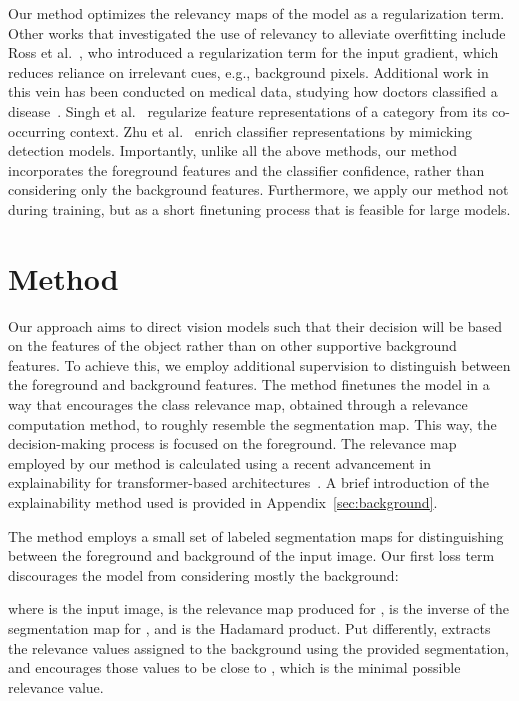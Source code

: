 \documentclass{article}
\begin{document}
Our method optimizes the relevancy maps of the model as a regularization term. Other works that investigated the use of relevancy to alleviate overfitting include Ross et al.~\cite{Ross2017RightFT}, who introduced a regularization term for the input gradient, which reduces reliance on irrelevant cues, e.g., background pixels. Additional work in this vein has been conducted on medical data, studying how doctors classified a disease~\cite{Simpson2019GradMaskRO, viviano2019saliency}. Singh et al.~\cite{singh2020don} regularize feature representations of a category from its co-occurring context. Zhu et al.~\cite{zhu2019deformable} enrich classifier representations by mimicking detection models. Importantly, unlike all the above methods, our method incorporates the foreground features and the classifier confidence, rather than considering only the background features. Furthermore, we apply our method not during training, but as a short finetuning process that is feasible for large models.


\section{Method}
\label{sec:method}


Our approach aims to direct vision models such that their decision will be based on the features of the object rather than on other supportive background features. To achieve this, we employ additional supervision to distinguish between the foreground and background features. The method finetunes the model in a way that encourages the class relevance map, obtained through a relevance computation method, to roughly resemble the segmentation map. This way, the decision-making process is focused on the foreground. 
The relevance map employed by our method is calculated using a recent advancement in explainability for transformer-based architectures~\cite{Chefer_2021_ICCV}. A brief introduction of the explainability method used is provided in Appendix~\ref{sec:background}.


The method employs a small set of labeled segmentation maps for distinguishing between the foreground and background of the input image. Our first loss term discourages the model from considering mostly the background:

where  is the input image,  is the relevance map produced for ,  is the inverse of the segmentation map for , and  is the Hadamard product. 
Put differently,  extracts the relevance values assigned to the background using the provided segmentation, and encourages those values to be close to , which is the minimal possible relevance value.
\end{document}
